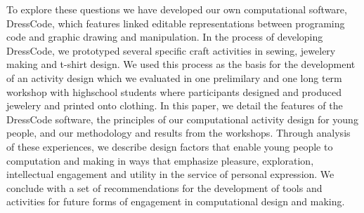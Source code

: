 \documentclass{sigchi}
\begin{document}
To explore these questions we have developed our own computational software, DressCode, which features linked editable representations between programing code and graphic drawing and manipulation. In the process of developing DressCode, we prototyped several specific craft activities in sewing, jewelery making and t-shirt design. We used this process as the basis for the development of an activity design which we evaluated in one prelimilary and one long term workshop with highschool students where participants designed and produced jewelery and printed onto clothing. In this paper, we detail the features of the DressCode software, the principles of our computational activity design for young people, and our methodology and results from the workshops. Through analysis of these experiences, we describe design factors that enable young people to computation and making in ways that emphasize pleasure, exploration, intellectual engagement and utility in the service of personal expression. We conclude with a set of recommendations for the development of tools and activities for future forms of engagement in computational design and making.
\end{document}
